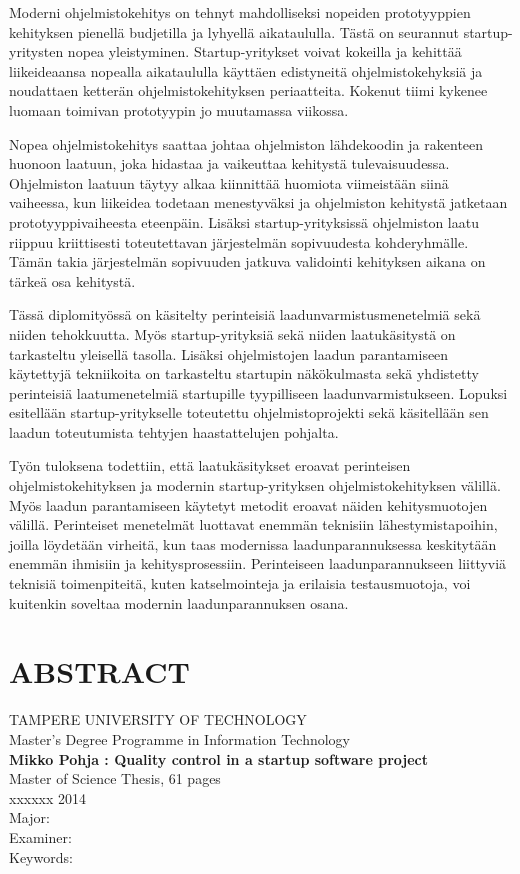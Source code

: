 \noindent
Moderni ohjelmistokehitys on tehnyt mahdolliseksi nopeiden prototyyppien kehityksen pienellä budjetilla ja lyhyellä aikataululla. Tästä on seurannut startup-yritysten nopea yleistyminen. Startup-yritykset voivat kokeilla ja kehittää liikeideaansa nopealla aikataululla käyttäen edistyneitä ohjelmistokehyksiä ja noudattaen ketterän ohjelmistokehityksen periaatteita. Kokenut tiimi kykenee luomaan toimivan prototyypin jo muutamassa viikossa.
 
\noindent
Nopea ohjelmistokehitys saattaa johtaa ohjelmiston lähdekoodin ja rakenteen huonoon laatuun, joka hidastaa ja vaikeuttaa kehitystä tulevaisuudessa. Ohjelmiston laatuun täytyy alkaa kiinnittää huomiota viimeistään siinä vaiheessa, kun liikeidea todetaan menestyväksi ja ohjelmiston kehitystä jatketaan prototyyppivaiheesta eteenpäin. Lisäksi startup-yrityksissä ohjelmiston laatu riippuu kriittisesti toteutettavan järjestelmän sopivuudesta kohderyhmälle. Tämän takia järjestelmän sopivuuden jatkuva validointi kehityksen aikana on tärkeä osa kehitystä.

\noindent
Tässä diplomityössä on käsitelty perinteisiä laadunvarmistusmenetelmiä sekä niiden tehokkuutta. Myös startup-yrityksiä sekä niiden laatukäsitystä on tarkasteltu yleisellä tasolla. Lisäksi ohjelmistojen laadun parantamiseen käytettyjä tekniikoita on tarkasteltu startupin näkökulmasta sekä yhdistetty perinteisiä laatumenetelmiä startupille tyypilliseen laadunvarmistukseen. Lopuksi esitellään startup-yritykselle toteutettu ohjelmistoprojekti sekä käsitellään sen laadun toteutumista tehtyjen haastattelujen pohjalta.

\noindent
Työn tuloksena todettiin, että laatukäsitykset eroavat perinteisen ohjelmistokehityksen ja modernin startup-yrityksen ohjelmistokehityksen välillä. Myös laadun parantamiseen käytetyt metodit eroavat näiden kehitysmuotojen välillä. Perinteiset menetelmät luottavat enemmän teknisiin lähestymistapoihin, joilla löydetään virheitä, kun taas modernissa laadunparannuksessa keskitytään enemmän ihmisiin ja kehitysprosessiin. Perinteiseen laadunparannukseen liittyviä teknisiä toimenpiteitä, kuten katselmointeja ja erilaisia testausmuotoja, voi kuitenkin soveltaa modernin laadunparannuksen osana. 

\newpage
\chapter*{ABSTRACT}
\begin{spacing}{1.0}
\textsf{TAMPERE UNIVERSITY OF TECHNOLOGY}\\
\textsf{Master's Degree Programme in Information Technology}\\
{\bf \textsf{Mikko Pohja : Quality control in a startup software project}}\\
\textsf{Master of Science Thesis, 61 pages}\\
\textsf{xxxxxx 2014}\\
\textsf{Major: }\\
\textsf{Examiner: }\\
\textsf{Keywords: }\\
\end{spacing}
 
